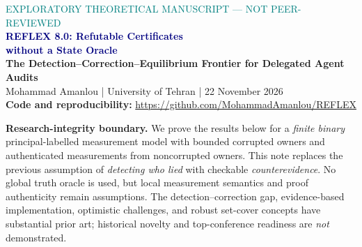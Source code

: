 \documentclass[10pt,a4paper]{article}
\begin{document}
\begin{center}
{\footnotesize\textcolor{teal}{EXPLORATORY THEORETICAL MANUSCRIPT --- NOT PEER-REVIEWED}}\\[5pt]
{\LARGE\bfseries\textcolor{navy}{REFLEX 8.0: Refutable Certificates\\[2pt] without a State Oracle}}\\[5pt]
{\normalsize\bfseries The Detection--Correction--Equilibrium Frontier for Delegated Agent Audits}\\[6pt]
{\small Mohammad Amanlou | University of Tehran | 22 November 2026}\\[2pt]
{\footnotesize\textbf{Code and reproducibility:} \url{https://github.com/MohammadAmanlou/REFLEX}}
\end{center}
\vspace{3pt}
\noindent\colorbox{shade}{\parbox{.965\linewidth}{\small\textbf{Research-integrity boundary.} We prove the results below for a \emph{finite binary} principal-labelled measurement model with bounded corrupted owners and authenticated measurements from noncorrupted owners. This note replaces the previous assumption of \emph{detecting who lied} with checkable \emph{counterevidence}. No global truth oracle is used, but local measurement semantics and proof authenticity remain assumptions. The detection--correction gap, evidence-based implementation, optimistic challenges, and robust set-cover concepts have substantial prior art; historical novelty and top-conference readiness are \emph{not} demonstrated.}}
\begin{abstract}
Can a network of self-interested delegated AI agents avoid ratifying false collective decisions without any referee who already knows the correct answer? We study a binary owner-labelled audit graph with arbitrary agent offsets, owner-level Byzantine manipulation, and verifiable cycle-parity counterevidence. We prove an exact three-regime separation: if the minimum owner transversal of decision-sensitive cycles is at most $k$, no transcript-based rule can simultaneously be honest-complete and $k$-sound; if it lies between $k+1$ and $2k$, abstaining sound certification is possible but total recovery is impossible; above $2k$, exact recovery is possible. We then specify a \emph{post-commit refutation game} whose challenge bounties make every subgame-perfect equilibrium free from \emph{false finalized certificates}, conditional on at most $k$ Byzantine principals and bounded honest challengers' outside incentives. In a distributed-evidence extension, robustness depends not only on the graph but on which independently authenticated principal can actually assemble a counterexample; we give an explicit witness-accessibility cut and exact small-instance custody synthesis. Exhaustive synthetic tests verify the predicted regimes and a pure-strategy challenge game. These results sharpen the program, but do not solve unrestricted collusion-proof truth elicitation or independent historical novelty.
\end{abstract}
\end{document}
